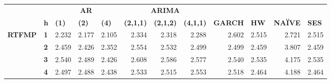\begin{table}[htbp]
  \centering
    \begin{tabular}{|cl|rrrrrrrrrr|}
\cmidrule{3-12}    \multicolumn{1}{c}{} &       & \multicolumn{3}{c}{\textbf{AR}} & \multicolumn{3}{c}{\textbf{ARIMA}} &       &       &       &  \\
    \multicolumn{1}{r}{} & \textbf{h} & \multicolumn{1}{l}{\textbf{(1)}} & \multicolumn{1}{l}{\textbf{(2)}} & \multicolumn{1}{l}{\textbf{(4)}} & \multicolumn{1}{l}{\textbf{(2,1,1)}} & \multicolumn{1}{l}{\textbf{(2,1,2)}} & \multicolumn{1}{l}{\textbf{(4,1,1)}} & \multicolumn{1}{l}{\textbf{GARCH}} & \multicolumn{1}{l}{\textbf{HW}} & \multicolumn{1}{l}{\textbf{NAÏVE}} & \multicolumn{1}{l|}{\textbf{SES}} \\
    \midrule
    \multirow{5}[2]{*}{\textbf{RTFMP}} & \textbf{1} & \cellcolor[rgb]{ .839,  .839,  .839}2.232 & \cellcolor[rgb]{ .847,  .847,  .847}2.177 & \cellcolor[rgb]{ .851,  .851,  .851}2.105 & \cellcolor[rgb]{ .831,  .831,  .831}2.334 & \cellcolor[rgb]{ .831,  .831,  .831}2.318 & \cellcolor[rgb]{ .835,  .835,  .835}2.288 & \cellcolor[rgb]{ .808,  .808,  .808}2.602 & \cellcolor[rgb]{ .816,  .816,  .816}2.515 & \cellcolor[rgb]{ .796,  .796,  .796}2.721 & \cellcolor[rgb]{ .816,  .816,  .816}2.515 \\
          & \textbf{2} & \cellcolor[rgb]{ .82,  .82,  .82}2.459 & \cellcolor[rgb]{ .824,  .824,  .824}2.426 & \cellcolor[rgb]{ .831,  .831,  .831}2.352 & \cellcolor[rgb]{ .812,  .812,  .812}2.554 & \cellcolor[rgb]{ .812,  .812,  .812}2.532 & \cellcolor[rgb]{ .816,  .816,  .816}2.499 & \cellcolor[rgb]{ .816,  .816,  .816}2.499 & \cellcolor[rgb]{ .82,  .82,  .82}2.459 & \cellcolor[rgb]{ .69,  .69,  .69}3.807 & \cellcolor[rgb]{ .82,  .82,  .82}2.459 \\
          & \textbf{3} & \cellcolor[rgb]{ .812,  .812,  .812}2.540 & \cellcolor[rgb]{ .816,  .816,  .816}2.489 & \cellcolor[rgb]{ .824,  .824,  .824}2.426 & \cellcolor[rgb]{ .804,  .804,  .804}2.608 & \cellcolor[rgb]{ .808,  .808,  .808}2.586 & \cellcolor[rgb]{ .808,  .808,  .808}2.577 & \cellcolor[rgb]{ .812,  .812,  .812}2.540 & \cellcolor[rgb]{ .812,  .812,  .812}2.535 & \cellcolor[rgb]{ .659,  .659,  .659}4.175 & \cellcolor[rgb]{ .812,  .812,  .812}2.535 \\
          & \textbf{4} & \cellcolor[rgb]{ .816,  .816,  .816}2.497 & \cellcolor[rgb]{ .816,  .816,  .816}2.488 & \cellcolor[rgb]{ .82,  .82,  .82}2.438 & \cellcolor[rgb]{ .812,  .812,  .812}2.533 & \cellcolor[rgb]{ .816,  .816,  .816}2.515 & \cellcolor[rgb]{ .812,  .812,  .812}2.553 & \cellcolor[rgb]{ .816,  .816,  .816}2.518 & \cellcolor[rgb]{ .82,  .82,  .82}2.464 & \cellcolor[rgb]{ .655,  .655,  .655}4.188 & \cellcolor[rgb]{ .82,  .82,  .82}2.464 \\

\end{tabular}
\end{table}
